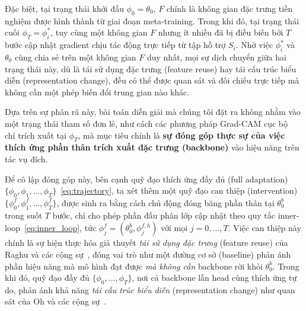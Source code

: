 Đặc biệt, tại trạng thái khởi đầu $\phi_0 = \theta_0$, $F$ chính là không gian đặc trưng tiền nghiệm được hình thành từ giai đoạn meta-training. Trong khi đó, tại trạng thái cuối $\phi_T = \phi_i^*$, tuy cùng một không gian $F$ nhưng ít nhiều đã bị điều biến bởi $T$ bước cập nhật gradient chịu tác động trực tiếp từ tập hỗ trợ $S_i$. Nhờ việc $\phi_i^*$ và $\theta_0$ cùng chia sẻ trên một không gian $F$ duy nhất, mọi sự dịch chuyển giữa hai trạng thái này, dù là tái sử dụng đặc trưng (feature reuse) hay tái cấu trúc biểu diễn (representation change), đều có thể được quan sát và đối chiếu trực tiếp mà không cần một phép biến đổi trung gian nào khác.

Dựa trên sự phân rã này, bài toán diễn giải mà chúng tôi đặt ra không nhằm vào một trạng thái tham số đơn lẻ, như cách các phương pháp Grad-CAM cục bộ~\cite{selvaraju2020grad, uddin2025expert} chỉ trích xuất tại $\phi_T$, mà mục tiêu chính là \textbf{sự đóng góp thực sự của việc thích ứng phần thân trích xuất đặc trưng (backbone)} vào hiệu năng trên tác vụ đích.

Để cô lập đóng góp này, bên cạnh quỹ đạo thích ứng đầy đủ (full adaptation) $\{\phi_0, \phi_1, \dots, \phi_T\}$~\eqref{eq:trajectory}, ta xét thêm một quỹ đạo can thiệp (intervention) $\{\phi_0^{f}, \phi_1^{f}, \dots, \phi_T^{f}\}$, được sinh ra bằng cách chủ động đóng băng phần thân tại $\theta_0^{b}$ trong suốt $T$ bước, chỉ cho phép phần đầu phân lớp cập nhật theo quy tắc inner-loop~\eqref{eq:inner_loop}, tức $\phi_j^{f} = (\theta_0^{b}, \phi_j^{f,h})$ với mọi $j = 0, \dots, T$. Việc can thiệp này chính là sự hiện thực hóa giả thuyết \emph{tái sử dụng đặc trưng} (feature reuse) của Raghu và các cộng sự~\cite{raghu2019rapid}, đóng vai trò như một đường cơ sở (baseline) phản ánh phần hiệu năng mà mô hình đạt được \emph{mà không cần} backbone rời khỏi $\theta_0^{b}$. Trong khi đó, quỹ đạo đầy đủ $\{\phi_0, \dots, \phi_T\}$, nơi cả backbone lẫn head cùng thích ứng tự do, phản ánh khả năng \emph{tái cấu trúc biểu diễn} (representation change) như quan sát của Oh và các cộng sự~\cite{oh2020boil}.

